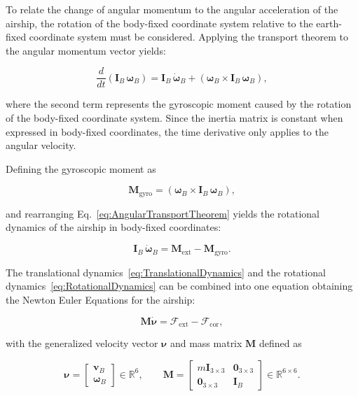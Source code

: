 To relate the change of angular momentum to the angular acceleration of the airship, the rotation of the body-fixed coordinate system relative to the earth-fixed coordinate system must be considered. Applying the transport theorem to the angular momentum vector yields:

\begin{equation}
	\frac{d}{dt} \left( \bm{I}_B \, \bm{\omega}_{B} \right)
	=
	\bm{I}_B \, \dot{\bm{\omega}}_B + \left( \bm{\omega}_B \times 	\bm{I}_B \, \bm{\omega}_B \right),
	\label{eq:AngularTransportTheorem}
\end{equation}

where the second term represents the gyroscopic moment caused by the rotation of the body-fixed coordinate system. Since the inertia matrix is constant when expressed in body-fixed coordinates, the time derivative only applies to the angular velocity.

Defining the gyroscopic moment as

\begin{equation}
	\bm{M}_\mathrm{gyro}
	=
	\left( \bm{\omega}_B \times \bm{I}_B \, \bm{\omega}_B \right),
	\label{eq:GyroscopicMoment}
\end{equation}

and rearranging Eq.~\eqref{eq:AngularTransportTheorem} yields the rotational dynamics of the airship in body-fixed coordinates:

\begin{equation}
	\bm{I}_B \, \dot{\bm{\omega}}_B
	=
	\bm{M}_\mathrm{ext} - \bm{M}_\mathrm{gyro}.
	\label{eq:RotationalDynamics}
\end{equation}

The translational dynamics~\eqref{eq:TranslationalDynamics} and the rotational dynamics~\eqref{eq:RotationalDynamics} can be combined into one equation obtaining the Newton Euler Equations for the airship:

\begin{equation}
	\bm{M}\dot{\bm{\nu}}
	=
	\bm{\mathcal{F}}_\mathrm{ext}
	-
	\bm{\mathcal{F}}_\mathrm{cor},
	\label{eq:EOMShort}
\end{equation}

with the generalized velocity vector $\bm{\nu}$ and mass matrix $\bm{M}$ defined as

\begin{equation}
	\bm{\nu}
	=
	\begin{bmatrix}
		\bm{v}_B\\ \bm{\omega}_B
	\end{bmatrix}
	\in\mathbb{R}^6,
	\qquad
	\bm{M}
	=
	\begin{bmatrix}
		m\bm{I}_{3\times3} & \bm{0}_{3\times3}\\
		\bm{0}_{3\times3} & \bm{I}_B
	\end{bmatrix}
	\in\mathbb{R}^{6\times6}.
	\label{eq:VelocityAndMassMatrix}
\end{equation}

